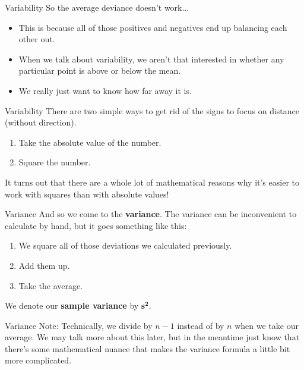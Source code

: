\begin{frame}{Variability}
    So the average deviance doesn't work... 
    \begin{itemize}
        \item This is because all of those positives and negatives end up balancing each other out. 
        \item When we talk about variability, we aren't that interested in whether any particular point is above or below the mean.
        \item We really just want to know how far away it is.
    \end{itemize}
\end{frame}

\begin{frame}{Variability}
    There are two simple ways to get rid of the signs to focus on distance (without direction).
    \begin{enumerate}
        \item Take the absolute value of the number.
        \item Square the number.
    \end{enumerate}
    
    \vspace{12pt}It turns out that there are a whole lot of mathematical reasons why it's easier to work with squares than with absolute values!
\end{frame}

\begin{frame}{Variance}
    And so we come to the \textbf{variance}. The variance can be inconvenient to calculate by hand, but it goes something like this:
    \begin{enumerate}
        \item We square all of those deviations we calculated previously.
        \item Add them up.
        \item Take the average.
    \end{enumerate}
    We denote our \textbf{sample variance} by $\boldsymbol{s^2}$.
\end{frame}

\begin{frame}{Variance}    
    \vspace{12pt}Note: Technically, we divide by $n-1$ instead of by $n$ when we take our average. We may talk more about this later, but in the meantime just know that there's some mathematical nuance that makes the variance formula a little bit more complicated. 
\end{frame}

